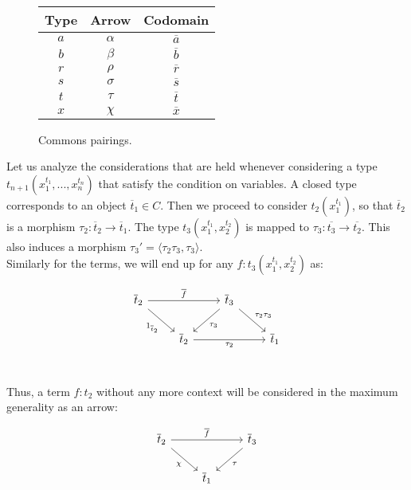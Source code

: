 \begin{definition}
\begin{remark}
  \begin{figure}[!h]
    \begin{center}
      \begin{tabular}{|c|c|c|} 
        \toprule
        Type & Arrow & Codomain \\
        \midrule
        $a$ & $\alpha$ & $\overline a$\\
        $b$ & $\beta$ & $\overline b$\\
        $r$ & $\rho$ & $\overline r$\\
        $s$ & $\sigma$ & $\overline s$\\
        $t$ & $\tau$ & $\overline t$\\
        $x$ & $\chi$ & $\overline x$\\
        \bottomrule
      \end{tabular}
    \end{center}
    \caption{Commons pairings.} \label{faketable:mul}
  \end{figure}

\end{remark}

\begin{remark}\label{multiple-def}
  Let us analyze the considerations that are held whenever considering a type $t_{n+1}(x_1^{t_1},...,x_n^{t_n})$ that satisfy the condition on variables.  A closed type corresponds to an object $\overline t_1\in C$. Then we proceed to consider $t_2(x_1^{t_1})$, so that $\overline t_2$ is a morphism $\tau_2:\overline t_2\to \overline t_1$. The type $t_{3}(x_1^{t_1}, x_2^{t_2})$ is mapped to $\tau_3: \overline{t_3}\to \overline{t_2}$. This also induces a morphism $\tau_3' = \langle \tau_2\tau_3, \tau_3\rangle$.\\

  Similarly for the terms, we will end up for any $f:t_3(x_1^{t_1}, x_2^{t_2})$ as:
  \[
    \begin{tikzpicture}
      \node {\begin{tikzcd}
          \overline t_2 \ar[rr,"\overline f"]\ar[rd,swap, "1_{\overline t_2}"] &  & \overline t_3 \ar[ld, "\tau_3"]\ar[rd, "\tau_2\tau_3"]  \\
          &   \overline t_2\ar[rr, swap, "\tau_2"] & & \overline t_1\\
        \end{tikzcd}};
    \end{tikzpicture}
  \]

  Thus, a term $f:t_2$ without any more context will be considered in the maximum generality as an arrow:
  \[
    \begin{tikzpicture}
      \node {\begin{tikzcd}
          \overline t_2 \ar[rr,"\overline f"]\ar[rd,swap, "\chi"] &  & \overline t_3 \ar[ld, "\tau"]  \\
          &   \overline t_1 & \\
        \end{tikzcd}};
    \end{tikzpicture}
  \]
  

\end{remark}
\end{definition}
